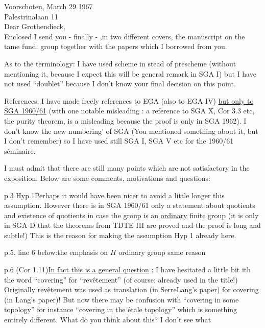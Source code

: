 Voorschoten, March 29 1967\\
Palestrinalaan 11\\

Dear Grothendieck,\\

Enclosed I send you - finally - ,in two different covers, the manuscript on the tame fund. group together with the papers which I borrowed from you.

As to the terminology: I have used scheme in stead of prescheme (without mentioning it, because I expect this will be  general remark in SGA I) but I have not used ``doublet'' because I don't know your final decision on this point.

References: I have made freely references to EGA (also to EGA IV) \uline{but only to SGA 1960/61} (with one notable misleading : a reference to SGA X, Cor 3.3 etc, the purity theorem, is a misleading because the proof is only in SGA 1962). I don't know the new numbering' of SGA (You mentioned something about it, but I don't remember) so I have used still SGA I, SGA V etc for the 1960/61 séminaire.

I must admit that there are still many points which are not satisfactory in the exposition. Below are some comments, motivations and questions:

p.3 Hyp.1\quad Perhaps it would have been nicer to avoid a little longer this assumption. However there is in SGA 1960/61 only a statement about quotients and existence of quotients in case the group is an \uline{ordinary} finite group (it is only in SGA D that the theorems from TDTE III are proved and the proof is long and subtle!) This is the reason for making the assumption Hyp 1 already here.

p.5. line 6 below:\quad the emphasis on $H$ ordinary group  same reason

p.6 (Cor 1.11)\quad \uline{In fact this is a general question} : I have hesitated a little bit ith the word ``covering'' for ``revêtement'' (of course: already used in the title!)
Originally revêtement was used as translation  (in SerreLang's paper) for covering (in Lang's paper)! But now there may be confusion with ``covering in some topology'' for instance ``covering in the étale topology'' which is something entirely different. What do you think about this? I don't see what
